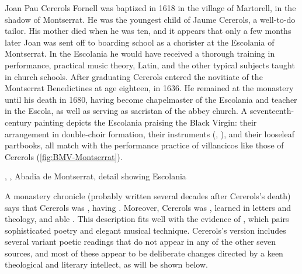 Joan Pau Cererols Fornell was baptized in 1618 in the village of Martorell, in
the shadow of Montserrat.%
    \Autocite{Balanza:CererolsFamily}
He was the youngest child of Jaume Cererols, a well-to-do tailor.
His mother died when he was ten, and it appears that only a few months later
Joan was sent off to boarding school as a chorister at the Escolania of
Montserrat.
In the Escolania he would have received a thorough training in performance,
practical music theory, Latin, and the other typical subjects taught in church
schools.
After graduating Cererols entered the novitiate of the Montserrat Benedictines
at age eighteen, in 1636.
He remained at the monastery until his death in 1680, having become chapelmaster
of the Escolania and teacher in the Escola, as well as serving as sacristan of
the abbey church.
A seventeenth-century painting depicts the Escolania praising the Black Virgin:
their arrangement in double-choir formation, their instruments (,
), and their looseleaf partbooks, all match with the performance
practice of villancicos like those of Cererols (\cref{fig:BMV-Montserrat}).%
    \Autocite[34]{Laplana:MontserratMuseu}

{, , Abadia de Montserrat, detail
showing Escolania}

A monastery chronicle (probably written several decades after Cererols's death)
says that Cererols was , having .
Moreover, Cererols was , learned in letters and
theology, and able .%
    \Autocite[7, note 2]{Estrada:CererolsBio}
This description fits well with the evidence of ,
which pairs sophisticated poetry and elegant musical technique.
Cererols's version includes several variant poetic readings that do not appear
in any of the other seven sources, and most of these appear to be deliberate
changes directed by a keen theological and literary intellect, as will be shown
below.

